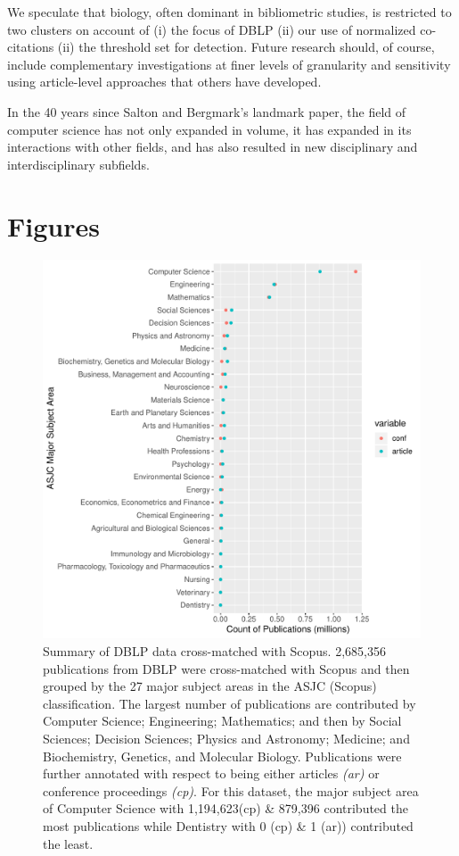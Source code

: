 We speculate that biology, often dominant in bibliometric studies, is restricted to two clusters on account of (i) the focus of DBLP (ii) our use of normalized co-citations (ii) the threshold set for detection. Future research should, of course, include complementary investigations at finer levels of granularity and sensitivity using article-level approaches that others have developed.

In the 40 years since Salton and Bergmark's landmark paper, the field of computer science has not only expanded in volume, it has expanded in its interactions with other fields, and has
also resulted in new disciplinary and interdisciplinary subfields. 

\clearpage

\section*{Figures}

\begin{figure}[ht]
  \includegraphics[scale=0.6]{ar_cp_ratio.pdf}
\caption{Summary of DBLP data cross-matched with Scopus. 2,685,356 publications from DBLP were cross-matched with Scopus and then grouped by the 27 major subject areas in the ASJC (Scopus) classification. The largest number of publications are contributed by Computer Science; Engineering; Mathematics; and then by Social Sciences; Decision Sciences; Physics and Astronomy; Medicine; and Biochemistry, Genetics, and Molecular Biology. Publications were further annotated with respect to being either articles \emph{(ar)} or conference proceedings \emph{(cp)}. For this dataset, the major subject area of Computer Science with 1,194,623(cp) \& 879,396 contributed the most publications while Dentistry with 0 (cp) \& 1 (ar)) contributed the least.}
\label{fig:ar_cp_annotation}       %
\end{figure}

